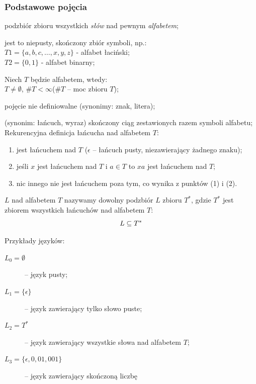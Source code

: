 \subsubsection{Podstawowe pojęcia}
\begin{description}
 \item[Język formalny] podzbiór zbioru wszystkich {\em słów} nad pewnym {\em
alfabetem};
 \item[Alfabet] jest to niepusty, skończony zbiór symboli, np.:\\
$T1 = \{a, b, c,\ldots, x, y, z\}$ - alfabet łaciński;\\
$T2 = \{0,1\}$ - alfabet binarny;
 \item Niech $T$ będzie alfabetem, wtedy:\\
$T \neq \emptyset$, $\#T < \infty$\qquad ($\#T$ -- moc zbioru $T$);
 \item[Symbol] pojęcie nie definiowalne (synonimy: znak, litera);
 \item[Słowo] (synonim: łańcuch, wyraz) skończony ciąg zestawionych razem
symboli alfabetu;\\
Rekurencyjna definicja łańcucha nad alfabetem $T$:
  \begin{enumerate}
    \item jest łańcuchem nad $T$ ($\epsilon$ -- łańcuch pusty, niezawierający
    żadnego znaku);
    \item jeśli $x$ jest łańcuchem nad $T$ i $a \in T$ to $xa$ jest łańcuchem
    nad $T$;
    \item nic innego nie jest łańcuchem poza tym, co wynika z punktów (1) i (2).
  \end{enumerate}
 \item[Językiem] $L$ nad alfabetem $T$ nazywamy dowolny podzbiór $L$ zbioru
$T^*$, gdzie $T^*$ jest zbiorem wszystkich łańcuchów nad alfabetem $T$:
  \begin{equation}
  L \subseteq T^*
  \vspace{-10pt}
  \end{equation}
 \item Przykłady języków:
  \begin{description}
   \item[$L_0 = \emptyset$]-- język pusty;
   \item[$L_1 = \{\epsilon\}$]-- język zawierający tylko słowo puste;
   \item[$L_2 = T^*$]-- język zawierający wszystkie słowa nad alfabetem $T$;
   \item[$L_3 = \{\epsilon, 0, 01, 001\}$]-- język zawierający skończoną liczbę

\end{description}
\end{description}
